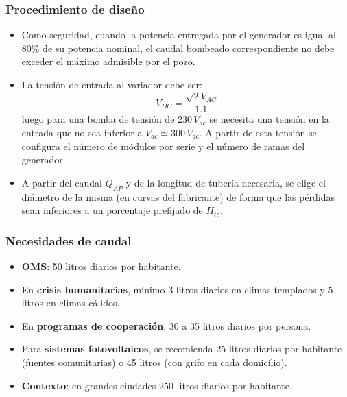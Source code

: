 \documentclass[serif, xcolor=dvipsnames]{beamer}
\begin{document}
\begin{frame}
\frametitle{Procedimiento de diseño}
\begin{itemize}
\item Como seguridad, cuando la potencia entregada por el generador es igual
al 80\% de su potencia nominal, el caudal bombeado correspondiente
no debe exceder el máximo admisible por el pozo.
\item La tensión de entrada al variador debe ser:\[
V_{DC}=\frac{\sqrt{2}V_{AC}}{1.1}\]
 luego para una bomba de tensión de $230\, V_{ac}$ se necesita una
tensión en la entrada que no sea inferior a $V_{dc}\simeq300\, V_{dc}$.
A partir de esta tensión se configura el número de módulos por serie
y el número de ramas del generador.
\item A partir del caudal $Q_{AP}$ y de la longitud de tubería necesaria,
se elige el diámetro de la misma (en curvas del fabricante) de forma
que las pérdidas sean inferiores a un porcentaje prefijado de $H_{te}$. 
\end{itemize}

\end{frame}
\begin{frame}
\frametitle{Necesidades de caudal}
\begin{itemize}
\item \textbf{OMS}: 50 litros diarios por habitante. 
\item En \textbf{crisis humanitarias}, mínimo 3 litros diarios en climas
templados y 5 litros en climas cálidos. 
\item En \textbf{programas de cooperación}, 30 a 35 litros diarios por persona. 
\item Para \textbf{sistemas fotovoltaicos}, se recomienda 25 litros diarios
por habitante (fuentes comunitarias) o 45 litros (con grifo en cada
domicilio).
\item \textbf{Contexto}: en grandes ciudades 250 litros diarios por habitante. 
\end{itemize}

\end{frame}
\end{document}
